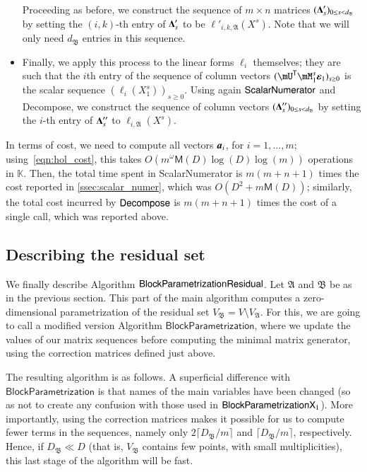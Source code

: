 \documentclass[final,1p,times,authoryear]{elsarticle}
\newcommand{\mat}[1]{\bm{\MakeUppercase{#1}}} %
\newcommand{\row}[1]{\bm{\MakeLowercase{#1}}} %
\newcommand{\col}[1]{\bm{\MakeLowercase{#1}}} %
\newcommand{\mainalgoname}{\mathsf{ BlockParametrization}}
\newcommand{\lf}{X}
\newcommand{\trsp}[1]{#1^{\mathsf{T}}} %
\def\M {\ensuremath{\mathsf{M}}}
\def\K{\mathbb{K}}
\def\K {\ensuremath{\mathbb{K}}}
\newcommand{\mUt}{\trsp{\mU}}
\begin{document}
\begin{itemize}
    \smallskip

    Proceeding as before, we construct the sequence of $m \times n$ matrices
    $(\mat{\Delta}'_s)_{0 \le s < d_\mathfrak{B}}$ by setting the
    $(i,k)$-th entry of $\mat{\Delta}'_s$ to be
    $\ell'_{i,k,\mathfrak{A}}(\lf^s)$. Note that we will only need $d_\mathfrak{B}$
    entries in this sequence.

    \smallskip

  \item Finally, we apply this process to the linear forms $\ell_i$
    themselves; they are such that the $i$th entry of the sequence of
    column vectors $(\mUt \mM_1^s \col{\varepsilon}_1)_{s \ge0}$ is
    the scalar sequence $(\ell_{i}(X_1^s))_{s \ge 0}$. Using again
    $\mathsf{{\sf ScalarNumerator}}$ and {\sf Decompose}, we construct
    the sequence of column vectors $(\mat{\Delta}''_s)_{0 \le s <
    d_\mathfrak{B}}$ by setting the $i$-th entry of $\mat{\Delta}''_s$
    to $\ell_{i,\mathfrak{A}}(\lf^s)$.
\end{itemize}

In terms of cost, we need to compute all vectors $\row{a}_i$, for
$i=1,\dots,m$; using~\cref{eqn:hol_cost}, this takes
$O(m^{\omega} \M(D) \log(D) \log(m))$ operations in $\K$.  Then, the total time
spent in {\sf ScalarNumerator} is $m(m+n+1)$ times the cost reported in
\cref{ssec:scalar_numer}, which was $O(D^2 + m\M(D))$; similarly, the total
cost incurred by ${\sf Decompose}$ is $m(m+n+1)$ times the cost of a single
call, which was reported above.


\subsection{Describing the residual set}

We finally describe Algorithm $\mainalgoname{\sf Residual}$.  Let
$\mathfrak{A}$ and $\mathfrak{B}$ be as in the previous section.  This
part of the main algorithm computes a zero-dimensional parametrization
of the residual set $V_\mathfrak{B}=V\setminus V_\mathfrak{A}$. For this, we
are going to call a modified version Algorithm
$\mathsf{BlockParametrization}$, where we update the values of our
matrix sequences before computing the minimal matrix generator, using
the correction matrices defined just above.

The resulting algorithm is as follows. A superficial difference with
$\mathsf{BlockParametrization}$ is that names of the main variables
have been changed (so as not to create any confusion with those used
in $\mainalgoname{\sf X}_1$). More importantly, using the correction
matrices makes it possible for us to compute fewer terms in the
sequences, namely only $2\lceil D_\mathfrak{B}/m\rceil$ and
$\lceil D_\mathfrak{B}/m\rceil$, respectively. Hence, if $D_\mathfrak{B} \ll D$
(that is, $V_\mathfrak{B}$ contains few points, with small
multiplicities), this last stage of the algorithm will be fast.
\end{document}
